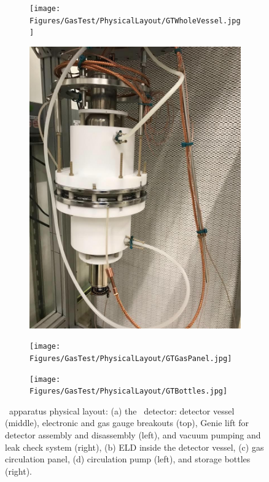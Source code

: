\begin{figure}[!p]
\centering
\begin{subfigure}[b]{\halfwidth}
  	    	\centering
 \texttt{[image: Figures/GasTest/PhysicalLayout/GTWholeVessel.jpg]}
 \caption{}
 \label{fig:chambergeneral:vessel}
\end{subfigure}
\begin{subfigure}[b]{\halfwidth}
  	    	\centering
 \includegraphics[width=\figurewidth,clip,trim={0 0 0 0},angle=0,origin=c]{Figures/GasTest/PhysicalLayout/GTGridTestRegion.jpg}
 \caption{}
 \label{fig:chambergeneral:gridtest}
\end{subfigure}
\begin{subfigure}[b]{\halfwidth}
  	    	\centering
 \texttt{[image: Figures/GasTest/PhysicalLayout/GTGasPanel.jpg]}
 \caption{}
 \label{fig:chambergeneral:panel}
\end{subfigure}
\begin{subfigure}[b]{\halfwidth}
  	    	\centering
 \texttt{[image: Figures/GasTest/PhysicalLayout/GTBottles.jpg]}
 \caption{}
 \label{fig:chambergeneral:bottles}
\end{subfigure}
\caption[\gtest\ apparatus physical layout]{\gtest\ apparatus physical layout: (a) the \gtest\ detector: detector vessel (middle),  electronic and gas gauge breakouts (top), Genie lift for detector assembly and disassembly (left), and vacuum pumping and leak check system (right), (b)  ELD inside the detector vessel, (c) gas circulation panel, (d) circulation pump (left), and storage bottles (right). }
\label{fig:chambergeneral}
\end{figure}

